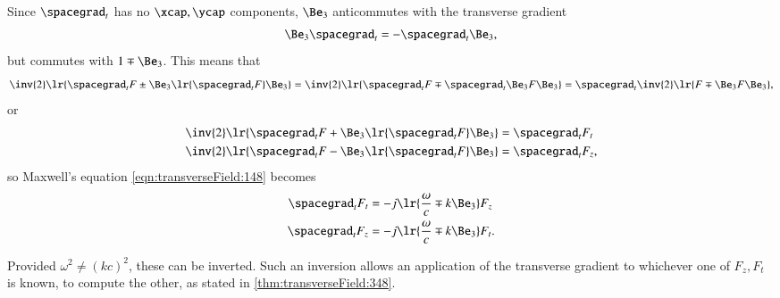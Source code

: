 Since \( \spacegrad_t \) has no \( \xcap, \ycap \) components, \( \Be_3 \) anticommutes with the transverse gradient
\begin{dmath}\label{eqn:transverseField:168}
\Be_3 \spacegrad_t = - \spacegrad_t \Be_3,
\end{dmath}
but commutes with \( 1 \mp \Be_3 \).
This means that
\begin{dmath}\label{eqn:transverseField:188}
\inv{2} \lr{ \spacegrad_t F \pm \Be_3 \lr{ \spacegrad_t F } \Be_3 }
=
\inv{2} \lr{ \spacegrad_t F \mp \spacegrad_t \Be_3 F \Be_3 }
=
\spacegrad_t
\inv{2} \lr{ F \mp \Be_3 F \Be_3 },
\end{dmath}
or
\begin{dmath}\label{eqn:transverseField:208}
\begin{aligned}
\inv{2} \lr{ \spacegrad_t F + \Be_3 \lr{ \spacegrad_t F } \Be_3 } &= \spacegrad_t F_t \\
\inv{2} \lr{ \spacegrad_t F - \Be_3 \lr{ \spacegrad_t F } \Be_3 } &= \spacegrad_t F_z,
\end{aligned}
\end{dmath}
so Maxwell's equation \cref{eqn:transverseField:148} becomes
\begin{dmath}\label{eqn:transverseField:228}
\begin{aligned}
\spacegrad_t F_t &= - j \lr{ \frac{\omega}{c} \mp k \Be_3 } F_z \\
\spacegrad_t F_z &= - j \lr{ \frac{\omega}{c} \mp k \Be_3 } F_t.
\end{aligned}
\end{dmath}

Provided \( \omega^2 \ne (k c)^2 \), these can be inverted.
Such an inversion allows an application of the transverse gradient to whichever one
of \( F_z, F_t \) is known, to compute the other, as stated in
\cref{thm:transverseField:348}.

